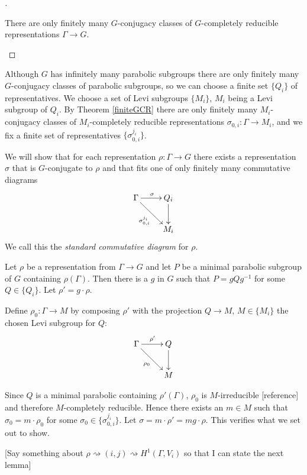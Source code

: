 \begin{proof}[]
	\begin{theorem} \label{finiteGCR} There are only finitely many $G$-conjugacy classes of $G$-completely reducible representations $\Gamma\rightarrow G$.\qedhere
	\end{theorem}
\end{proof}

Although $G$ has infinitely many parabolic subgroups there are only finitely many $G$-conjugacy classes of parabolic subgroups, so we can choose a finite set $\{Q_i\}$ of representatives. We choose a set of Levi subgroups $\{M_i\}$, $M_i$ being a Levi subgroup of $Q_i$. By Theorem \ref{finiteGCR} there are only finitely many $M_i$-conjugacy classes of $M_i$-completely reducible representations $\sigma_{0, i}:\Gamma\rightarrow M_i$, and we fix a finite set of representatives $\{\sigma^{j_i}_{0,i}\}$.

We will show that for each representation $\rho:\Gamma\rightarrow G$ there exists a representation $\sigma$ that is $G$-conjugate to $\rho$ and that fits one of only finitely many commutative diagrams
\begin{displaymath}
	\xymatrix{
	\Gamma \ar[r]^{\sigma} \ar[rd]_{\sigma^{j_i}_{0,i}} & Q_i \ar[d]\\
	& M_i}
\end{displaymath}
We call this the \emph{standard commutative diagram} for $\rho$.

Let $\rho$ be a representation from $\Gamma\rightarrow G$ and let $P$ be a minimal parabolic subgroup of $G$ containing $\rho(\Gamma)$. Then there is a $g$ in $G$ such that $P = gQg^{-1}$ for some $Q\in\{Q_i\}$. Let $\rho' = g\cdot \rho$. 

Define $\rho_0:\Gamma\rightarrow M$ by composing $\rho'$ with the projection $Q\rightarrow M$, $M\in\{M_i\}$ the chosen Levi subgroup for $Q$:
\begin{displaymath}
	\xymatrix{
	\Gamma \ar[r]^{\rho'} \ar[rd]_{\rho_0} & Q \ar[d]\\
	& M}
\end{displaymath}

Since $Q$ is a minimal parabolic containing $\rho'(\Gamma)$, $\rho_0$ is $M$-irreducible [reference] and therefore $M$-completely reducible. Hence there exists an $m\in M$ such that $\sigma_0 = m\cdot \rho_0$ for some $\sigma_0\in\{\sigma^{j_i}_{0,i}\}$. Let $\sigma = m\cdot \rho' = mg\cdot \rho$. This verifies what we set out to show.

[Say something about $\rho \rightsquigarrow (i,j) \rightsquigarrow H^1(\Gamma,V_i)$ so that I can state the next lemma]

